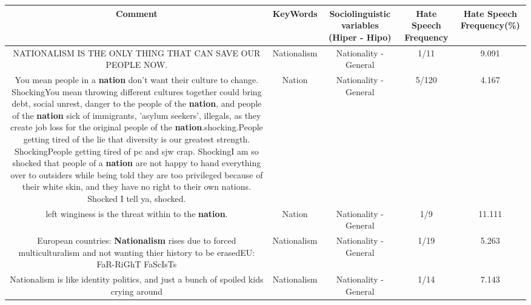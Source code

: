\documentclass[11pt]{article}
\newlength\mylength
\begin{document}
\begin{center}
\setlength\mylength{\dimexpr\textwidth - 1\arrayrulewidth - 50\tabcolsep}
\begin{longtable}{|C{.65\mylength}|C{.30\mylength}|C{.12\mylength}|C{.12\mylength}|C{.12\mylength}|}
\hline
\textbf{Comment} & \textbf{KeyWords} & \textbf{Sociolinguistic variables (Hiper - Hipo)}  & \textbf{Hate Speech Frequency} & \textbf{Hate Speech Frequency(\%)} \\
\hline{}\small NATIONALISM IS THE ONLY THING THAT CAN SAVE OUR PEOPLE NOW.\normalsize   & Nationalism & Nationality - General & 1/11 & 9.091 \\  \hline
  \small You mean people in a \textbf{nation} don't want their culture to change. ShockingYou mean throwing different cultures together could bring debt, social unrest, danger to the people of the \textbf{nation}, and people of the \textbf{nation} sick of immigrants, 'asylum seekers', illegals, as they create job loss for the original people of the \textbf{nation}.shocking.People getting tired of the lie that diversity is our greatest strength. ShockingPeople getting tired of pc and sjw crap. ShockingI am so shocked that people of a \textbf{nation} are not happy to hand everything over to outsiders while being told they are too privileged because of their white skin, and they have no right to their own nations. Shocked I tell ya, shocked.\normalsize   & Nation & Nationality - General & 5/120 & 4.167 \\  \hline
  \small left winginess is the threat within to the \textbf{nation}.\normalsize   & Nation & Nationality - General & 1/9 & 11.111 \\  \hline
  \small European countries: \textbf{Nationalism} rises due to forced multiculturalism and not wanting thier history to be erasedEU: FaR-RiGhT FaScIsTs\normalsize   & Nationalism & Nationality - General & 1/19 & 5.263 \\  \hline
  \small Nationalism is like identity politics, and just a bunch of spoiled kids crying around\normalsize   & Nationalism & Nationality - General & 1/14 & 7.143 \\  \hline

\end{longtable}
\end{center}
\end{document}
